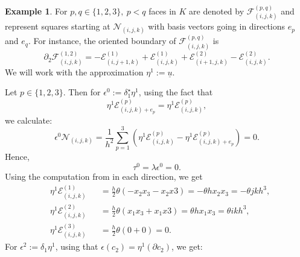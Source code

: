 \documentclass[fleqn]{article}
\theoremstyle{definition}
\newtheorem{example}[theorem]{Example}
\begin{document}
\begin{example}
  For $p, q \in \{1, 2, 3\},\ p < q$ faces in $K$ are denoted by
  $\mathcal{F}^{(p, q)}_{(i, j, k)}$ and represent squares starting at
  $\mathcal{N}_{(i, j, k)}$ with basis vectors going in directions
  $e_p$ and $e_q$.
  For instance, the oriented boundary of $\mathcal{F}^{(p, q)}_{(i, j, k)}$ is
  \begin{equation}
    \partial_2 \mathcal{F}^{(1, 2)}_{(i, j, k)} =
    - \mathcal{E}^{(1)}_{(i, j + 1, k)}
    + \mathcal{E}^{(1)}_{(i, j, k)}
    + \mathcal{E}^{(2)}_{(i + 1, j, k)}
    - \mathcal{E}^{(2)}_{(i, j, k)}.
  \end{equation}
  We will work with the approximation $\eta^1 := \underline{u}$.
  
  Let $p \in \{1, 2, 3\}$.
  Then for $\epsilon^0 := \delta_1^\star \eta^1$, using the fact that
  \begin{equation}
    \eta^1 \mathcal{E}^{(p)}_{(i, j, k) + e_p} =
    \eta^1 \mathcal{E}^{(p)}_{(i, j, k)},
  \end{equation}
  we calculate:
  \begin{equation}
    \epsilon^0 \mathcal{N}_{(i, j, k)}
    =
      \frac{1}{h^2}
      \sum_{p = 1}^3 (
          \eta^1 \mathcal{E}^{(p)}_{(i, j, k)}
        - \eta^1 \mathcal{E}^{(p)}_{(i, j, k) + e_p}
      )
    = 0.
  \end{equation}
  Hence,
  \begin{equation}
    \tau^0 = \lambda \epsilon^0 = 0.
  \end{equation} 
  Using the computation from
  in each direction, we get
  \begin{subequations}
    \begin{alignat}{2}
      & \eta^1 \mathcal{E}^{(1)}_{(i, j, k)} && 
        = \frac{h}{2}\theta (-x_2 x_3 - x_2 x3)
        = - \theta h x_2 x_3
        = - \theta j k h^3, \\
      & \eta^1 \mathcal{E}^{(2)}_{(i, j, k)} && 
        = \frac{h}{2}\theta (x_1 x_3 + x_1 x3)
        = \theta h x_1 x_3
        = \theta i k h^3, \\
      & \eta^1 \mathcal{E}^{(3)}_{(i, j, k)} && 
        = \frac{h}{2}\theta (0 + 0)
        = 0.
    \end{alignat}
  \end{subequations}
  For $\epsilon^2 := \delta_1 \eta^1$, using that
  $\epsilon(c_2) = \eta^1(\partial c_2)$, we get:
  \begin{subequations}
    \begin{alignat}{2}

\end{alignat}
\end{subequations}
\end{example}
\end{document}
